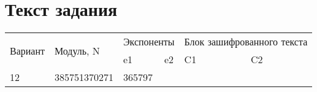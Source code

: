 \documentclass[a4paper, 14pt]{report}
\begin{document}
\section*{Текст задания}
\begin{table}[h]
    \centering
    \begin{tabular}{|l|l|ll|ll|}
        \hline
        \multirow{2}{*}{Вариант}                                                                                                                                         &
        \multirow{2}{*}{Модуль, N}                                                                                                                                       &
        \multicolumn{2}{l|}{Экспоненты}                                                                                                                                  &
        \multicolumn{2}{l|}{Блок зашифрованного текста}                                                                                                                    \\ \cline{3-6}
                                                                                                                                                                         &
                                                                                                                                                                         &
        \multicolumn{1}{l|}{e1}                                                                                                                                          &
        e2                                                                                                                                                               &
        \multicolumn{1}{l|}{C1}                                                                                                                                          &
        C2                                                                                                                                                                 \\ \hline
        12                                                                                                                                                               &
        385751370271                                                                                                                                                     &
        \multicolumn{1}{l|}{365797}                                                                                                                                      &

\end{tabular}
\end{table}
\end{document}
